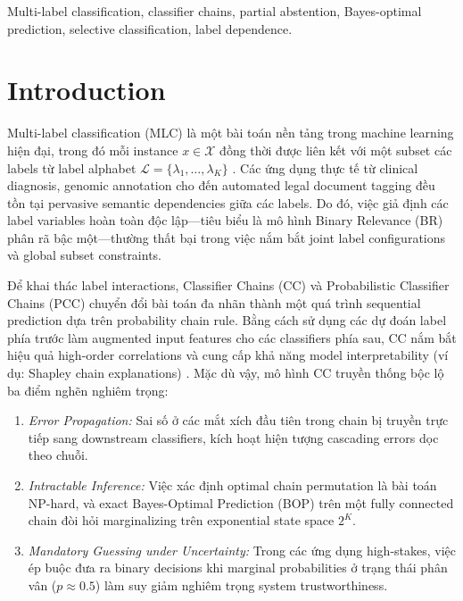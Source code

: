 \documentclass[conference]{IEEEtran}
\begin{document}
\begin{IEEEkeywords}
Multi-label classification, classifier chains, partial abstention, Bayes-optimal prediction, selective classification, label dependence.
\end{IEEEkeywords}

\section{Introduction}
Multi-label classification (MLC) là một bài toán nền tảng trong machine learning hiện đại, trong đó mỗi instance $x \in \mathcal{X}$ đồng thời được liên kết với một subset các labels từ label alphabet $\mathcal{L} = \{\lambda_1, \dots, \lambda_K\}$ \cite{zhang2018binary, read2011classifier}. Các ứng dụng thực tế từ clinical diagnosis, genomic annotation cho đến automated legal document tagging đều tồn tại pervasive semantic dependencies giữa các labels. Do đó, việc giả định các label variables hoàn toàn độc lập—tiêu biểu là mô hình Binary Relevance (BR) phân rã bậc một—thường thất bại trong việc nắm bắt joint label configurations và global subset constraints.

Để khai thác label interactions, Classifier Chains (CC) \cite{read2011classifier} và Probabilistic Classifier Chains (PCC) \cite{cheng2010bayes} chuyển đổi bài toán đa nhãn thành một quá trình sequential prediction dựa trên probability chain rule. Bằng cách sử dụng các dự đoán label phía trước làm augmented input features cho các classifiers phía sau, CC nắm bắt hiệu quả high-order correlations và cung cấp khả năng model interpretability (ví dụ: Shapley chain explanations) \cite{read2011classifier}. Mặc dù vậy, mô hình CC truyền thống bộc lộ ba điểm nghẽn nghiêm trọng:
\begin{enumerate}
    \item \textit{Error Propagation:} Sai số ở các mắt xích đầu tiên trong chain bị truyền trực tiếp sang downstream classifiers, kích hoạt hiện tượng cascading errors dọc theo chuỗi.
    \item \textit{Intractable Inference:} Việc xác định optimal chain permutation là bài toán NP-hard, và exact Bayes-Optimal Prediction (BOP) trên một fully connected chain đòi hỏi marginalizing trên exponential state space $2^K$.
    \item \textit{Mandatory Guessing under Uncertainty:} Trong các ứng dụng high-stakes, việc ép buộc đưa ra binary decisions khi marginal probabilities ở trạng thái phân vân ($p \approx 0.5$) làm suy giảm nghiêm trọng system trustworthiness.
\end{enumerate}
\end{document}

